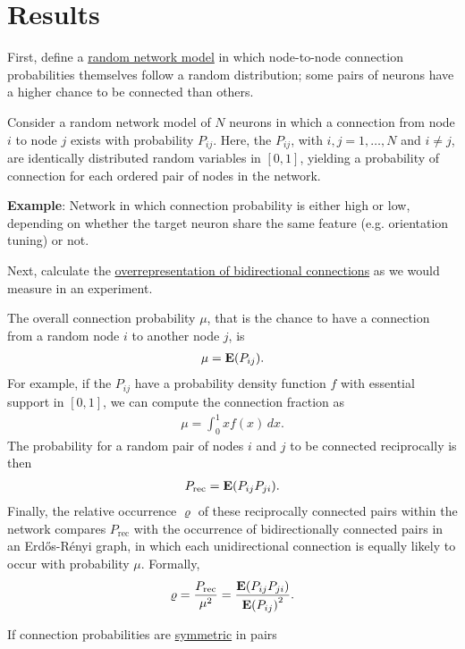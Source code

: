 
\section*{Results}

First, define a \underline{random network model} in which node-to-node connection probabilities themselves follow a random distribution; some pairs of neurons have a higher chance to be connected than others.


Consider a random network model of $N$ neurons in which a connection from node $i$ to node $j$ exists with probability $P_{ij}$.
%
Here, the $P_{ij}$, with $i,j = 1,\dots,N$ and $i \neq j$, are identically distributed random variables in $[0,1]$, yielding a probability of connection for each ordered pair of nodes in the network.

\textbf{\textcolor{gblue}{Example}}: Network in which connection probability is either high or low, depending on whether the target neuron share the same feature (e.g. orientation tuning) or not.

Next, calculate the \underline{overrepresentation of bidirectional connections} as we would measure in an experiment.

The overall connection probability $\mu$, that is the chance to have a connection from a random node $i$ to another node $j$, is
\begin{align}
\mu = \operatorname{\mathbf{E}}(P_{ij}).
\end{align}
For example, if the $P_{ij}$ have a probability density function $f$ with essential support in $[0,1]$, we can compute the connection fraction as
\begin{align}
  \mu = \int_0^1 x f(x)\,dx.
\end{align}
The probability for a random pair of nodes $i$ and $j$ to be connected reciprocally is then
\begin{align}
P_{\mathrm{rec}} = \operatorname{\mathbf{E}}(P_{ij} P_{ji}).
\end{align}
Finally, the relative occurrence $\varrho$ of these reciprocally connected pairs within the network compares $P_{\mathrm{rec}}$ with the occurrence of bidirectionally connected pairs in an Erd\H{o}s-R\'{e}nyi graph, in which each unidirectional connection is equally likely to occur with probability $\mu$. Formally,
\begin{align}
  \varrho = \frac{P_{\mathrm{rec}}}{\mu^2} = \frac{\E\left(P_{ij}P_{ji}\right)}{{\E\left(P_{ij}\right)}^2}.
\end{align}

If connection probabilities are \underline{symmetric} in pairs

